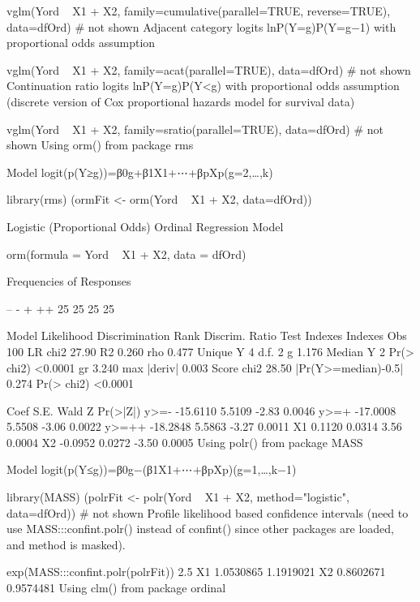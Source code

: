 vglm(Yord ~ X1 + X2, family=cumulative(parallel=TRUE, reverse=TRUE), data=dfOrd)
# not shown
Adjacent category logits lnP(Y=g)P(Y=g−1) with proportional odds assumption

vglm(Yord ~ X1 + X2, family=acat(parallel=TRUE), data=dfOrd)
# not shown
Continuation ratio logits lnP(Y=g)P(Y<g) with proportional odds assumption (discrete version of Cox proportional hazards model for survival data)

vglm(Yord ~ X1 + X2, family=sratio(parallel=TRUE), data=dfOrd)
# not shown
Using orm() from package rms

Model logit(p(Y≥g))=β0g+β1X1+⋯+βpXp(g=2,…,k)

library(rms)
(ormFit <- orm(Yord ~ X1 + X2, data=dfOrd))

Logistic (Proportional Odds) Ordinal Regression Model

orm(formula = Yord ~ X1 + X2, data = dfOrd)

Frequencies of Responses

--  -  + ++ 
25 25 25 25 

                      Model Likelihood          Discrimination          Rank Discrim.    
                         Ratio Test                 Indexes                Indexes       
Obs           100    LR chi2      27.90    R2                  0.260    rho     0.477    
Unique Y        4    d.f.             2    g                   1.176                     
Median Y        2    Pr(> chi2) <0.0001    gr                  3.240                     
max |deriv| 0.003    Score chi2   28.50    |Pr(Y>=median)-0.5| 0.274                     
                     Pr(> chi2) <0.0001                                                  

      Coef     S.E.   Wald Z Pr(>|Z|)
y>=-  -15.6110 5.5109 -2.83  0.0046  
y>=+  -17.0008 5.5508 -3.06  0.0022  
y>=++ -18.2848 5.5863 -3.27  0.0011  
X1      0.1120 0.0314  3.56  0.0004  
X2     -0.0952 0.0272 -3.50  0.0005  
Using polr() from package MASS

Model logit(p(Y≤g))=β0g−(β1X1+⋯+βpXp)(g=1,…,k−1)

library(MASS)
(polrFit <- polr(Yord ~ X1 + X2, method="logistic", data=dfOrd))
# not shown
Profile likelihood based confidence intervals (need to use MASS:::confint.polr() instead of confint() since other packages are loaded, and method is masked).

exp(MASS:::confint.polr(polrFit))
       2.5 %
X1 1.0530865 1.1919021
X2 0.8602671 0.9574481
Using clm() from package ordinal

